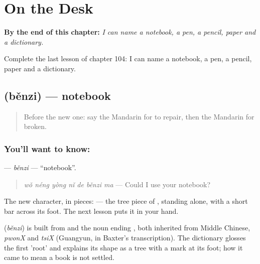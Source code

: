 
\chapter{On the Desk}
\label{ch:zh-on-the-desk}

\begin{chapteropening}
\textbf{By the end of this chapter:} \emph{I can name a notebook, a pen, a pencil, paper and a dictionary.}

Complete the last lesson of chapter 104: I can name a notebook, a pen, a pencil, paper and a dictionary.
\end{chapteropening}

\section[\texorpdfstring{\zh{本子} (běnzi)}{本子 (běnzi)}]{ (běnzi) — notebook}

\label{lesson:ZH-C104-benzi}



\begin{quote}
Before the new one: say the Mandarin for to repair, then the Mandarin for broken.
\end{quote}

\subsection*{You'll want to know: }
\textbf{} — \emph{běnzi} — \textquotedblleft{}notebook\textquotedblright{}.

\begin{quote}
\textbf{} \emph{wǒ néng yòng nǐ de běnzi ma} — Could I use your notebook?
\end{quote}

The new character, in pieces:  — the tree piece of , standing alone, with a short bar across its foot. The next lesson puts it in your hand.

\begin{cousinweb}
\textbf{} (\emph{běnzi}) is built from  and the noun ending , both inherited from Middle Chinese, \emph{pwonX} and \emph{tsiX} (Guangyun, in Baxter's transcription). The dictionary glosses the first 'root' and explains its shape as a tree with a mark at its foot; how it came to mean a book is not settled.
\end{cousinweb}

